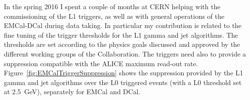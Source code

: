 \documentclass[12pt, a4paper, twoside, titlepage]{article}
\begin{document}
In the spring 2016 I spent a couple of months at CERN helping with the commissioning of the L1 triggers, as well as with general operations of the EMCal-DCal during data taking.
In particular my contribution is related to the fine tuning of the trigger thresholds for the L1 gamma and jet algorithms. The thresholds are set according to the physics goals discussed
and approved by the different working groups of the Collaboration. The triggers need also to provide a suppression compatible with the ALICE maximum read-out rate.
Figure~\ref{fig:EMCalTriggerSuppression} shows the suppression provided by the L1 gamma and jet algorithms over the L0 triggered events (with a L0 threshold set at 2.5~GeV), separately for EMCal and DCal.

{}

\end{document}
